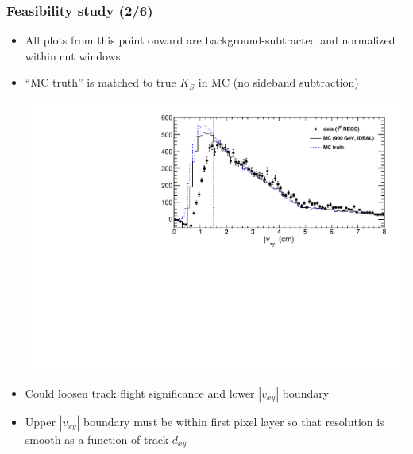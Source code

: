\documentclass[compress]{beamer}
\begin{document}
\begin{frame}
\frametitle{Feasibility study (2/6)}
\begin{itemize}
\item All plots from this point onward are background-subtracted and
  normalized within cut windows

\item ``MC truth'' is matched to true $K_S$ in MC (no sideband subtraction)
\begin{center}
\includegraphics[width=0.9\linewidth]{kaonTracking_vxy.pdf}
\end{center}

\item Could loosen track flight significance and lower $|v_{xy}|$ boundary

\item Upper $|v_{xy}|$ boundary must be within first pixel layer so that resolution is smooth as a function of track $d_{xy}$
\end{itemize}
\end{frame}
\end{document}
